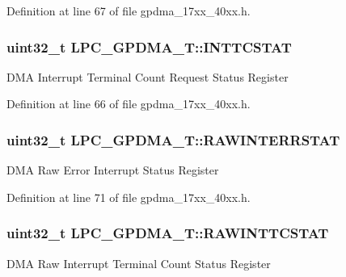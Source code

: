 Definition at line 67 of file gpdma\+\_\+17xx\+\_\+40xx.\+h.

\subsubsection[{\texorpdfstring{I\+N\+T\+T\+C\+S\+T\+AT}{INTTCSTAT}}]{ uint32\+\_\+t L\+P\+C\+\_\+\+G\+P\+D\+M\+A\+\_\+\+T\+::\+I\+N\+T\+T\+C\+S\+T\+AT}\hypertarget{structLPC__GPDMA__T_a2ca8f15773342988a28ba333cf73c380}{}\label{structLPC__GPDMA__T_a2ca8f15773342988a28ba333cf73c380}
D\+MA Interrupt Terminal Count Request Status Register 

Definition at line 66 of file gpdma\+\_\+17xx\+\_\+40xx.\+h.

\subsubsection[{\texorpdfstring{R\+A\+W\+I\+N\+T\+E\+R\+R\+S\+T\+AT}{RAWINTERRSTAT}}]{ uint32\+\_\+t L\+P\+C\+\_\+\+G\+P\+D\+M\+A\+\_\+\+T\+::\+R\+A\+W\+I\+N\+T\+E\+R\+R\+S\+T\+AT}\hypertarget{structLPC__GPDMA__T_ae4bf6971c867a0892da2cf449c341122}{}\label{structLPC__GPDMA__T_ae4bf6971c867a0892da2cf449c341122}
D\+MA Raw Error Interrupt Status Register 

Definition at line 71 of file gpdma\+\_\+17xx\+\_\+40xx.\+h.

\subsubsection[{\texorpdfstring{R\+A\+W\+I\+N\+T\+T\+C\+S\+T\+AT}{RAWINTTCSTAT}}]{ uint32\+\_\+t L\+P\+C\+\_\+\+G\+P\+D\+M\+A\+\_\+\+T\+::\+R\+A\+W\+I\+N\+T\+T\+C\+S\+T\+AT}\hypertarget{structLPC__GPDMA__T_a215d6f79819ceb03fd00ecae1324a7c8}{}\label{structLPC__GPDMA__T_a215d6f79819ceb03fd00ecae1324a7c8}
D\+MA Raw Interrupt Terminal Count Status Register 

